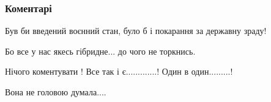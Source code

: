  
 
 
 
 
\subsubsection{Коментарі}
\label{sec:08_08_2021.fb.mischenko_andrej.1.maguchih_moskovia_ukraina.cmt}

\begin{itemize}
 
Був би введений воєнний стан, було б і покарання за державну зраду!

 
Бо все у нас якесь гібридне... до чого не торкнись.

 
Нічого коментувати !
Все так і є.............!
Один в один.........!

 
Вона не головою думала....

 


\end{itemize}
